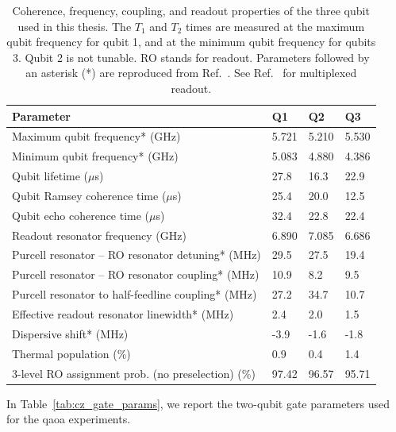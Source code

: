 \begin{table}[ht]
\centering
\caption{Coherence, frequency, coupling, and readout properties of the three qubit used in this thesis. The $T_1$ and $T_2$ times are measured at the maximum qubit frequency for qubit 1, and at the minimum qubit frequency for qubits 3. Qubit 2 is not tunable. RO stands for readout. Parameters followed by an asterisk (*) are reproduced from Ref.\  \cite{Andersen2019a}. See Ref.\ \cite{Andersen2019} for multiplexed readout.} %
\label{tab:app_setup_qubit_params}
\begin{tabularx}{\textwidth}{llll}
\toprule
Parameter & \textbf{Q1} & \textbf{Q2} & \textbf{Q3} \\ 
\midrule
Maximum qubit frequency* (GHz) & \multicolumn{1}{c}{5.721} & \multicolumn{1}{c}{5.210} & \multicolumn{1}{c}{5.530} \\
Minimum qubit frequency* (GHz) & 5.083 & 4.880 & 4.386  \\
Qubit lifetime ($\mu$s) & 27.8 & 16.3 & 22.9  \\
Qubit Ramsey coherence time ($\mu$s) & 25.4 & 20.0 & 12.5  \\
Qubit echo coherence time ($\mu$s) & 32.4 & 22.8 & 22.4 \\
Readout resonator frequency (GHz) & 6.890 & 7.085 & 6.686  \\
Purcell resonator – RO resonator detuning* (MHz) & 29.5 & 27.5 & 19.4 \\
Purcell resonator – RO resonator coupling* (MHz) & 10.9 & 8.2 & 9.5 \\
Purcell resonator to half-feedline coupling* (MHz) & 27.2 & 34.7 & 10.7 \\
Effective readout resonator linewidth* (MHz) & 2.4 & 2.0 & 1.5  \\
Dispersive shift* (MHz) & -3.9 & -1.6 & -1.8 \\
Thermal population (\%) & 0.9 & 0.4 & 1.4  \\ 
3-level RO assignment prob. (no preselection) (\%) & 97.42 & 96.57 & 95.71\\
\bottomrule
\end{tabularx}
\end{table}

In Table~\ref{tab:cz_gate_params}, we report the two-qubit gate parameters used for the \gls{qaoa} experiments.

